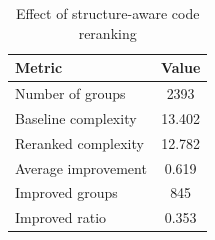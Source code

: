 \begin{table}[t]
\centering
\caption{Effect of structure-aware code reranking}
\label{tab:structure_aware_reranking}
\begin{tabular}{lc}
\toprule
Metric & Value \\
\midrule
Number of groups & 2393 \\
Baseline complexity & 13.402 \\
Reranked complexity & 12.782 \\
Average improvement & 0.619 \\
Improved groups & 845 \\
Improved ratio & 0.353 \\
\bottomrule
\end{tabular}
\end{table}
